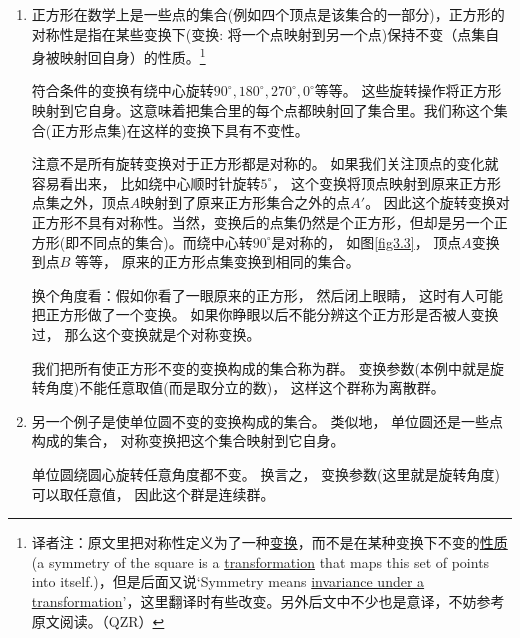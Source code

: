 \begin{enumerate}
	\item 正方形在数学上是一些点的集合(例如四个顶点是该集合的一部分)，正方形的对称性是指在某些变换下(变换: 将一个点映射到另一个点)保持不变（点集自身被映射回自身）的性质。\footnote{译者注：原文里把对称性定义为了一种\underline{变换}，而不是在某种变换下不变的\underline{性质}(a symmetry of the square is a \underline{transformation} that maps this set of points into itself.)，但是后面又说`Symmetry means \underline{invariance under a transformation}'，这里翻译时有些改变。另外后文中不少也是意译，不妨参考原文阅读。（QZR）}

	符合条件的变换有绕中心旋转$90^\circ, 180^\circ, 270^\circ, 0^\circ$等等。 这些旋转操作将正方形映射到它自身。这意味着把集合里的每个点都映射回了集合里。我们称这个集合(正方形点集)在这样的变换下具有不变性。



	注意不是所有旋转变换对于正方形都是对称的。 如果我们关注顶点的变化就容易看出来， 比如绕中心顺时针旋转$5^\circ$， 这个变换将顶点映射到原来正方形点集之外，顶点$A$映射到了原来正方形集合之外的点$A'$。 因此这个旋转变换对正方形不具有对称性。当然，变换后的点集仍然是个正方形，但却是另一个正方形(即不同点的集合)。而绕中心转$90^\circ$是对称的， 如图\ref{fig3.3}， 顶点$A$变换到点$B$ 等等， 原来的正方形点集变换到相同的集合。

	{
	}

	换个角度看：假如你看了一眼原来的正方形， 然后闭上眼睛， 这时有人可能把正方形做了一个变换。 如果你睁眼以后不能分辨这个正方形是否被人变换过， 那么这个变换就是个对称变换。

	我们把所有使正方形不变的变换构成的集合称为群。 变换参数(本例中就是旋转角度)不能任意取值(而是取分立的数)， 这样这个群称为离散群。

	\item 另一个例子是使单位圆不变的变换构成的集合。 类似地， 单位圆还是一些点构成的集合， 对称变换把这个集合映射到它自身。

	单位圆绕圆心旋转任意角度都不变。 换言之， 变换参数(这里就是旋转角度)可以取任意值， 因此这个群是连续群。
\end{enumerate}

